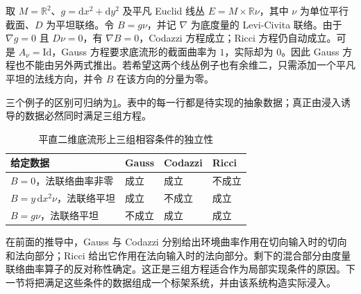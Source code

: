 \begin{example}\label{g3:exm:codazzi-ricci-without-gauss}
	取 \(M=\mathbb R^2\)、\(g=\mathrm dx^2+\mathrm dy^2\) 及平凡 Euclid 线丛 \(E=M\times\mathbb R\nu\)，其中 \(\nu\) 为单位平行截面、\(D\) 为平坦联络。令 \(B=g\nu\)，并记 \(\nabla\) 为底度量的 Levi-Civita 联络。由于 \(\nabla g=0\) 且 \(D\nu=0\)，有 \(\nabla B=0\)，Codazzi 方程成立；Ricci 方程仍自动成立。可是 \(A_\nu=\mathrm{Id}\)，Gauss 方程要求底流形的截面曲率为 \(1\)，实际却为 \(0\)。因此 Gauss 方程也不能由另外两式推出。若希望这两个线丛例子也有余维二，只需添加一个平凡平坦的法线方向，并令 \(B\) 在该方向的分量为零。
\end{example}

三个例子的区别可归纳为\cref{g3:tab:compatibility-independence}。表中的每一行都是待实现的抽象数据；真正由浸入诱导的数据必然同时满足三组方程。

\begin{table}[htbp]
	\centering
	\caption{平直二维底流形上三组相容条件的独立性}
	\label{g3:tab:compatibility-independence}
	\begin{tabular}{llll}
		\toprule
		给定数据 & Gauss & Codazzi & Ricci \\
		\midrule
		\(B=0\)，法联络曲率非零 & 成立 & 成立 & 不成立 \\
		\(B=y\,\mathrm dx^2\nu\)，法联络平坦 & 成立 & 不成立 & 成立 \\
		\(B=g\nu\)，法联络平坦 & 不成立 & 成立 & 成立 \\
		\bottomrule
	\end{tabular}
\end{table}

在前面的推导中，Gauss 与 Codazzi 分别给出环境曲率作用在切向输入时的切向和法向部分；Ricci 给出它作用在法向输入时的法向部分。剩下的混合部分由度量联络曲率算子的反对称性确定。这正是三组方程适合作为局部实现条件的原因。下一节将把满足这些条件的数据组成一个标架系统，并由该系统构造实际浸入。
